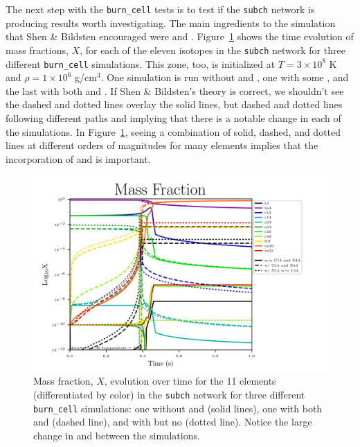 \documentclass[preprint]{aastex62}
\begin{document}
      The next step with the {\tt burn\_cell} tests is to test if the {\tt subch} network is producing results worth investigating. The main ingredients to the simulation that Shen \& Bildsten encouraged were  and  \citep{shenNbildsten}. Figure~\ref{fig:microphysicsX} shows the time evolution of mass fractions, $X$, for each of the eleven isotopes in the {\tt subch} network for three different {\tt burn\_cell} simulations. This zone, too, is initialized at $T = 3 \times 10^8$ K and $\rho = 1 \times 10^6$ g/cm$^3$. One simulation is run without  and , one with some , and the last with both  and . If Shen \& Bildsten's theory is correct, we shouldn't see the dashed and dotted lines overlay the solid lines, but dashed and dotted lines following different paths and implying that there is a notable change in each of the simulations. In Figure~\ref{fig:microphysicsX}, seeing a combination of solid, dashed, and dotted lines at different orders of magnitudes for many elements implies that the incorporation of  and  is important. 
      
      \begin{figure}
        \centering
        \includegraphics[width=5.5in]{images/subch_nC14nN14_xn_tol-10.png}
        \caption{Mass fraction, $X$, evolution over time for the 11 elements (differentiated by color) in the {\tt subch} network for three different {\tt burn\_cell} simulations: one without  and  (solid lines), one with both  and  (dashed line), and with  but no  (dotted line). Notice the large change in  and  between the simulations.
          }
        \label{fig:microphysicsX}
      \end{figure} 
      
\end{document}
